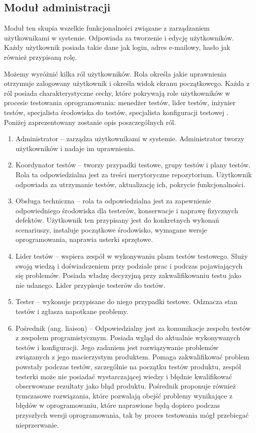 \subsection{Moduł administracji}

Moduł ten skupia wszelkie funkcjonalności związane z zarządzaniem użytkownikami w systemie. Odpowiada za tworzenie i edycję użytkowników. Każdy użytkownik posiada takie dane jak login, adres e-mailowy, hasło jak również przypisaną rolę.

Możemy wyróżnić kilka ról użytkowników. Rola określa jakie uprawnienia otrzymuje zalogowany użytkownik i określa widok ekranu początkowego. Każda z ról posiada charakterystyczne cechy, które pokrywają role użytkowników w procesie testowania oprogramowania: menedżer testów, lider testów, inżynier testów, specjalista środowiska do testów, specjalista konfiguracji testowej \cite{peopleWare}. Poniżej zaprezentowany zostanie opis poszczególnych ról.
\begin{enumerate}
  \item Administrator --  zarządza użytkownikami w systemie. Administrator tworzy użytkowników i nadaje im uprawnienia.
  \item Koordynator testów -- tworzy przypadki testowe, grupy testów i plany testów. Rola ta odpowiedzialna jest za treści merytoryczne repozytorium. Użytkownik odpowiada za utrzymanie testów, aktualizację ich, pokrycie funkcjonalności. 
  \item Obsługa techniczna -- rola ta odpowiedzialna jest za zapewnienie odpowiedniego środowiska dla testerów, konserwacje i naprawę fizycznych defektów. Użytkownik ten przypisany jest do konkretnych wykonań scenariuszy, instaluje początkowe środowisko, wymagane wersje oprogramowania, naprawia usterki sprzętowe.
  \item Lider testów -- wspiera zespół w wykonywaniu planu testów testowego. Służy swoją wiedzą i doświadczeniem przy podziale prac i podczas pojawiających się problemów. Posiada władzę decyzyjną przy zakwalifikowaniu testu jako nie udanego. Lider przypisuje testerów do testów.
  \item Tester --  wykonuje przypisane do niego przypadki testowe. Odznacza stan testów i zgłasza napotkane problemy.
  \item Pośrednik (ang. liaison) --  Odpowiedzialny jest za komunikacje zespołu testów z zespołem programistycznym. Posiada wgląd do aktualnie wykonywanych testów i konfiguracji. Jego zadaniem jest rozwiązywanie problemów związanych z jego macierzystym produktem. Pomaga zakwalifikować problem powstały podczas testów, szczególnie na początku testów produktu, zespół testerki może nie posiadać wystarczającej wiedzy i błędnie kwalifikować obserwowane rezultaty jako błąd produktu. Pośrednik proponuje również tymczasowe rozwiązania, które pozwalają obejść problemy wynikające z błędów w oprogramowaniu, które naprawione będą dopiero podczas przyszłych wersji oprogramowania, tak by proces testowania mógł przebiegać nieprzerwanie.
\end{enumerate}
  

